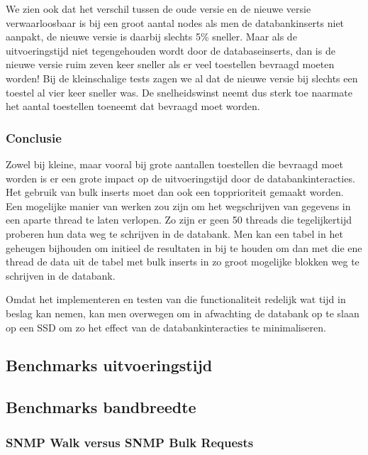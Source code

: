 We zien ook dat het verschil tussen de oude versie en de nieuwe versie verwaarloosbaar is bij een groot aantal nodes als men de databankinserts niet aanpakt,
de nieuwe versie is daarbij slechts 5\% sneller.
Maar als de uitvoeringstijd niet tegengehouden wordt door de databaseinserts,
dan is de nieuwe versie ruim zeven keer sneller als er veel toestellen bevraagd moeten worden!
Bij de kleinschalige tests zagen we al dat de nieuwe versie bij slechts een toestel al vier keer sneller was.
De snelheidswinst neemt dus sterk toe naarmate het aantal toestellen toeneemt dat bevraagd moet worden.

\subsubsection{Conclusie}

Zowel bij kleine, maar vooral bij grote aantallen toestellen die bevraagd moet worden is er een grote impact op de uitvoeringstijd door de databankinteracties.
Het gebruik van bulk inserts moet dan ook een topprioriteit gemaakt worden.
Een mogelijke manier van werken zou zijn om het wegschrijven van gegevens in een aparte thread te laten verlopen.
Zo zijn er geen 50 threads die tegelijkertijd proberen hun data weg te schrijven in de databank.
Men kan een tabel in het geheugen bijhouden om initieel de resultaten in bij te houden om dan met die ene thread
de data uit de tabel met bulk inserts in zo groot mogelijke blokken weg te schrijven in de databank.

Omdat het implementeren en testen van die functionaliteit redelijk wat tijd in beslag kan nemen,
kan men overwegen om in afwachting de databank op te slaan op een SSD om zo het effect van de databankinteracties te minimaliseren.


\subsection{Benchmarks uitvoeringstijd}


\subsection{Benchmarks bandbreedte}


\subsubsection{SNMP Walk versus SNMP Bulk Requests}

